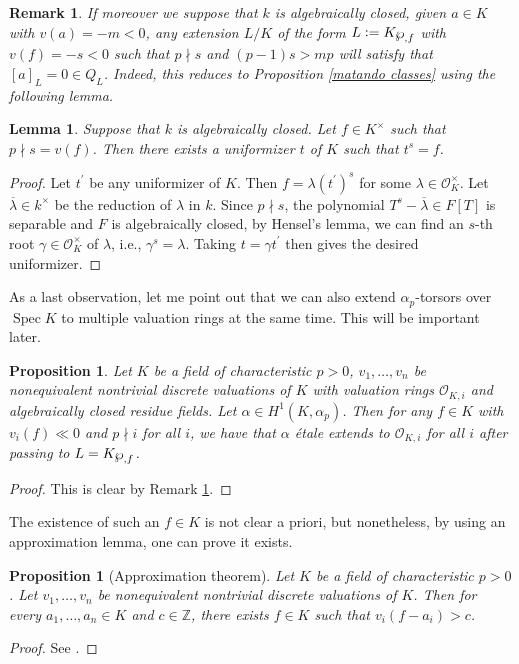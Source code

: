 \documentclass[a4paper,english,12pt]{amsart}
\newtheorem{proposition}[definition]{Proposition}
\newtheorem{lemma}[definition]{Lemma}
\newtheorem{remark}[definition]{Remark}
\numberwithin{equation}{section}
\newcommand{\defeq}{\vcentcolon=}
\DeclareMathOperator{\Spec}{Spec}
\renewcommand{\wp}{\ensuremath\raisebox{\depth}{$\mathchar"17D$}}
\renewcommand{\_}{\rule{0.25cm}{0.4pt}}
\begin{document}
\begin{remark}\label{sep fechado}
    If moreover we suppose that $k$ is algebraically closed, given $a\in K$ with $v(a)=-m<0$, any extension $L/K$ of the form $L\defeq K_{\wp, f}$ with $v(f)=-s<0$ such that $p\nmid s$ and $(p-1)s>mp$ will satisfy that $[a]_{L}=0\in Q_{L}$.
    Indeed, this reduces to Proposition \ref{matando classes} using the following lemma.
\end{remark}

\begin{lemma}
    Suppose that $k$ is algebraically closed. Let $f\in K^{\times}$ such that $p\nmid s=v(f)$. Then there exists a uniformizer $t$ of $K$ such that $t^{s}=f$.
\end{lemma}
\begin{proof}
    Let $t^{\prime}$ be any uniformizer of $K$. Then $f=\lambda (t^{\prime})^{s}$ for some $\lambda\in \mathcal{O}_{K}^{\times}$.
    Let $\overline{\lambda}\in k^{\times}$ be the reduction of $\lambda$ in $k$. Since $p\nmid s$, the polynomial $T^{s}-\overline{\lambda}\in F[T]$ is separable and $F$ is algebraically closed, by Hensel's lemma, we can find an $s$-th root $\gamma\in \mathcal{O}_{K}^{\times}$ of $\lambda$, i.e., $\gamma^{s}=\lambda$. Taking $t=\gamma t^{\prime}$ then gives the desired uniformizer.
\end{proof}

As a last observation, let me point out that we can also extend $\alpha_{p}$-torsors over $\Spec K$ to multiple valuation rings at the same time. This will be important later.

\begin{proposition}\label{extensao multipla alpha_{p}}
    Let $K$ be a field of characteristic $p>0$, $v_{1},\dots , v_{n}$ be nonequivalent nontrivial discrete valuations of $K$ with valuation rings $\mathcal{O}_{K,i}$ and algebraically closed residue fields. Let $\alpha\in H^{1}(K,\alpha_{p})$. Then for any $f\in K$ with $v_{i}(f)\ll 0$ and $p\nmid i$ for all $i$, we have that $\alpha$ étale extends to $\mathcal{O}_{K,i}$ for all $i$ after passing to $L=K_{\wp, f}$. 
\end{proposition}
\begin{proof}
  This is clear by Remark \ref{sep fechado}.
\end{proof}

The existence of such an $f\in K$ is not clear a priori, but nonetheless, by using an approximation lemma, one can prove it exists.

\begin{proposition}[Approximation theorem]
    Let $K$ be a field of characteristic $p>0$. Let $v_{1},\dots , v_{n}$ be nonequivalent nontrivial discrete valuations of $K$. Then for every $a_{1},\dots, a_{n}\in K$ and $c\in \mathbb{Z}$, there exists $f\in K$ such that $v_{i}(f-a_{i})>c$.
\end{proposition}
\begin{proof}
    See \cite[Prop. I.3.7.]{MR1915966}.
\end{proof}
\end{document}
